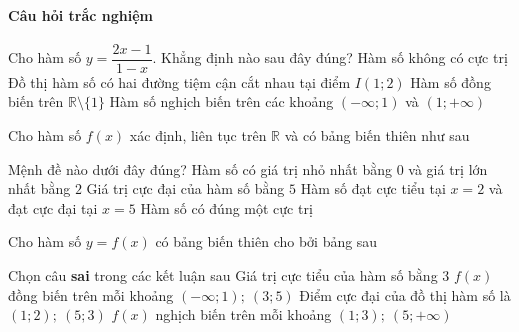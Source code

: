 \paragraph{Câu hỏi trắc nghiệm}
\begin{ex}%
	Cho hàm số $y=\dfrac{2x-1}{1-x}$. Khẳng định nào sau đây đúng?
	\choice
	{\True  Hàm số không có cực trị}
	{Đồ thị hàm số có hai đường tiệm cận cắt nhau tại điểm $I(1;2)$}
	{Hàm số đồng biến trên $\mathbb{R}\setminus\{1\}$}
	{Hàm số nghịch biến trên các khoảng $(-\infty;1)$ và $(1;+\infty)$}
\end{ex}
\begin{ex}%
	Cho hàm số $f(x)$ xác định, liên tục trên $\mathbb{R}$ và có bảng biến thiên như sau
	\begin{center}
     \end{center}
	Mệnh đề nào dưới đây đúng?
	\choice
	{Hàm số có giá trị nhỏ nhất bằng $0$ và giá trị lớn nhất bằng $2$}
	{Giá trị cực đại của hàm số bằng $5$}
	{\True Hàm số đạt cực tiểu tại $x=2$ và đạt cực đại tại $x=5$}
	{Hàm số có đúng một cực trị}
\end{ex}
\begin{ex}%
	Cho hàm số $y=f(x)$ có bảng biến thiên cho bởi bảng sau
	\begin{center}
	\end{center}
	Chọn câu \textbf{sai} trong các kết luận sau
	\choice
	{\True Giá trị cực tiểu của hàm số bằng $3$}
	{$f(x)$ đồng biến trên mỗi khoảng $\left(-\infty;1\right);~ \left(3;5\right)$}
	{Điểm cực đại của đồ thị hàm số là $(1;2);~(5;3)$}
	{$f(x)$ nghịch biến trên mỗi khoảng $(1;3);~\left(5;+\infty\right)$}
\end{ex}
